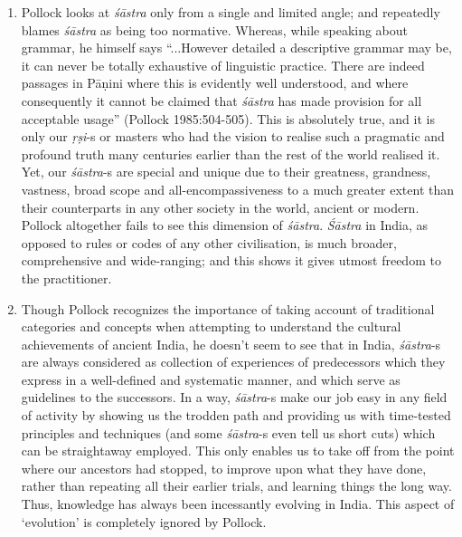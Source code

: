\begin{enumerate}
\item Pollock looks at {\sl śāstra} only from a single and limited angle; and repeatedly blames {\sl śāstra} as being too normative. Whereas, while speaking about grammar, he himself says ``...However detailed a descriptive grammar may be, it can never be totally exhaustive of linguistic practice. There are indeed passages in Pāṇini where this is evidently well understood, and where consequently it cannot be claimed that {\sl śāstra} has made provision for all acceptable usage'' (Pollock 1985:504-505). This is absolutely true, and it is only our {\sl ṛṣi}-s or masters who had the vision to realise such a pragmatic and profound truth many centuries earlier than the rest of the world realised it.  Yet, our {\sl śāstra}-s are special and unique due to their greatness, grandness, vastness, broad scope and all-encompassiveness to a much greater extent than their counterparts in any other society in the world, ancient or modern. Pollock altogether fails to see this dimension of {\sl śāstra}. {\sl Śāstra} in India, as opposed to rules or codes of any other civilisation, is much broader, comprehensive and wide-ranging; and this shows it gives utmost freedom to the practitioner.

\item Though Pollock recognizes the importance of taking account of traditional categories and concepts when attempting to understand the cultural achievements of ancient India, he doesn't seem to see that in India, {\sl śāstra}-s are always considered as collection of experiences of predecessors which they express in a well-defined and systematic manner, and which serve as guidelines to the successors. In a way, {\sl śāstra}-s make our job easy in any field of activity by showing us the trodden path and providing us with time-tested principles and techniques (and some {\sl śāstra}-s even tell us short cuts) which can be straightaway employed. This only enables us to take off from the point where our ancestors had stopped, to improve upon what they have done, rather than repeating all their earlier trials, and learning things the long way. Thus, knowledge has always been incessantly evolving in India. This aspect of `evolution' is completely ignored by Pollock.


\end{enumerate}

